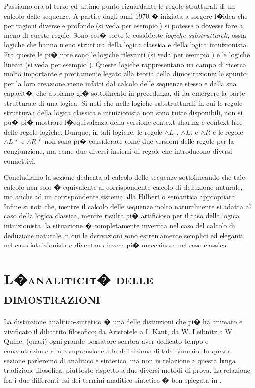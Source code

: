 \documentclass[a4paper,12pt]{aphex}
\begin{document}
Passiamo ora al terzo ed ultimo punto riguardante le regole strutturali di un calcolo delle sequenze. A partire dagli anni 1970 � iniziata a sorgere l�idea che per ragioni diverse e profonde (si veda per esempio \cite{restall}) si potesse o dovesse fare a meno di queste regole.  Sono cos� sorte le cosiddette \emph{logiche substrutturali}, ossia logiche che hanno meno struttura della logica classica e della logica intuizionista. Fra queste le pi� note sono le logiche rilevanti (si veda per esempio \cite{belnap}) e  le logiche lineari (si veda per esempio \cite{girard}).  Queste logiche rappresentano un campo di ricerca molto importante e prettamente legato alla teoria della dimostrazione: lo spunto per la loro creazione viene  infatti dal calcolo delle sequenze stesso e dalla sua capacit�, che abbiamo gi� sottolineato in precedenza, di far emergere la parte strutturale di una logica. 
Si noti che nelle logiche substrutturali in cui le regole strutturali della logica classica e intuizionista non sono tutte disponibili, non si pu� pi� mostrare l�equivalenza della versione context-sharing e context-free delle regole logiche. Dunque, in tali logiche, le regole  $\wedge L_{1}$, $\wedge L_{2}$ e $\wedge R$ e le regole $\wedge L*$ e $\wedge R*$  non sono pi� considerate come due versioni delle regole per la congiunzione, ma come due diversi insiemi di regole che introducono  diversi connettivi. 


Concludiamo la sezione dedicata al calcolo delle sequenze sottolineando che tale calcolo non solo � equivalente al corrispondente calcolo di deduzione naturale, ma anche ad un corrispondente sistema alla Hilbert o semantica appropriata. Infine si noti che, mentre il calcolo delle sequenze molto naturalmente si adatta al caso della logica classica, mentre risulta pi� artificioso per il caso della logica intuizionista, la situazione � completamente invertita nel caso del calcolo di deduzione naturale in cui le derivazioni sono estremamente semplici ed eleganti nel caso intuizionista e diventano invece pi� macchinose nel caso classico.



\section{\textsc{L�analiticit� delle dimostrazioni}}

La distinzione analitico-sintetico � una delle distinzioni che pi� ha animato e vivificato il dibattito filosofico; da Aristotele a I. Kant, da W. Leibnitz  a W. Quine, (quasi) ogni grande pensatore sembra aver dedicato tempo e concentrazione  alla comprensione e la definizione di tale binomio. In questa sezione parleremo di analitico e sintetico,  ma non in relazione a questa lunga tradizione filosofica, piuttosto rispetto a due diversi  metodi di prova. La relazione fra i due differenti usi dei termini analitico-sintetico � ben spiegata in \cite{hintikka}.
\end{document}
